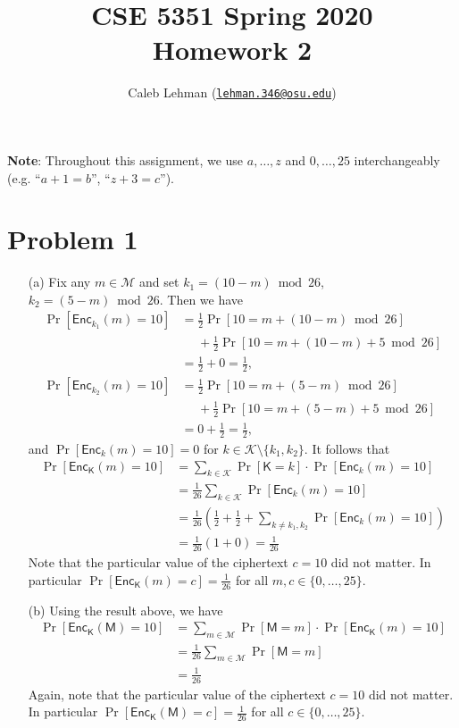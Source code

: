 \documentclass[12pt]{article}
\title{%
CSE 5351 Spring 2020\\
Homework 2
}
\author{%
Caleb Lehman
(\href{mailto:lehman.346@osu.edu}{\texttt{lehman.346@osu.edu}})
}
\date{%
}
\numberwithin{equation}{section}
\theoremstyle{plain}
\newcommand{\set}[1]{\{ #1 \}}
\DeclareMathOperator*{\prob}{Pr}
\newcommand{\ptexts}{\mathcal{M}}
\newcommand{\ptext}{\algo{M}}
\newcommand{\keys}{\mathcal{K}}
\newcommand{\key}{\algo{K}}
\newcommand{\algo}[1]{\mathsf{#1}}
\newcommand{\enc}{\algo{Enc}}
\begin{document}
\maketitle

\textbf{Note}: Throughout this assignment,
we use $a, \ldots, z$ and $0, \ldots, 25$ interchangeably (e.g. ``$a + 1 = b$'', ``$z + 3 = c$'').

\section*{Problem 1}

\begin{enumerate}
    \item[(a)] Fix any $m \in \ptexts$ and set $k_1 = (10 - m) \bmod 26$, $k_2 = (5 - m) \bmod 26$.
    Then we have
    \begin{align*}
        \prob[\enc_{k_1}(m) = 10]
            &= \frac{1}{2} \prob[10 = m + (10 - m) \bmod 26]\\
            &\mathrel{\phantom{=}} \mathrel{+} \frac{1}{2} \prob[10 = m + (10 - m) + 5 \bmod 26]\\
            &= \frac{1}{2} + 0 = \frac{1}{2},\\
        \prob[\enc_{k_2}(m) = 10]
            &= \frac{1}{2} \prob[10 = m + (5 - m) \bmod 26]\\
            &\mathrel{\phantom{=}} \mathrel{+} \frac{1}{2} \prob[10 = m + (5 - m) + 5 \bmod 26]\\
            &= 0 + \frac{1}{2} = \frac{1}{2},
    \end{align*}
    and $\prob[\enc_{k}(m) = 10] = 0$ for $k \in \keys \setminus \set{ k_1, k_2 }$.
    It follows that
    \begin{align*}
        \prob[\enc_{\key}(m) = 10]
            &= \sum_{k \in \keys}{ \prob[\key = k] \cdot \prob[\enc_{k}(m) = 10] }\\
            &= \frac{1}{26} \sum_{k \in \keys} { \prob[\enc_{k}(m) = 10] }\\
            &= \frac{1}{26} ( \frac{1}{2} + \frac{1}{2} + \sum_{k \neq k_1, k_2} { \prob[\enc_{k}(m) = 10] } )\\
            &= \frac{1}{26} ( 1 + 0 ) = \frac{1}{26}
    \end{align*}
    Note that the particular value of the ciphertext $c = 10$ did not matter.
    In particular $\prob[\enc_{\key}(m) = c] = \frac{1}{26}$
    for all $m, c \in \set{ 0, \ldots, 25 }$.

    \item[(b)] Using the result above, we have
    \begin{align*}
        \prob[\enc_{\key}(\ptext) = 10]
            &= \sum_{m \in \ptexts}{ \prob[\ptext = m] \cdot \prob[\enc_{\key}(m) = 10] }\\
            &= \frac{1}{26} \sum_{m \in \ptexts}{ \prob[\ptext = m] }\\
            &= \frac{1}{26}
    \end{align*}
    Again, note that the particular value of the ciphertext $c = 10$ did not matter.
    In particular $\prob[\enc_{\key}(\ptext) = c] = \frac{1}{26}$
    for all $c \in \set{ 0, \ldots, 25 }$.
\end{enumerate}
\end{document}
